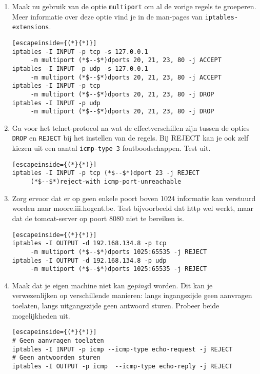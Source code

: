 \documentclass{report}
\begin{document}
\begin{enumerate}
	\item     Maak nu gebruik van de optie \texttt{multiport} om al de vorige regels te groeperen. Meer informatie over deze optie vind je in de man-pages van \texttt{iptables-extensions}.
	\begin{lstlisting}[escapeinside={(*}{*)}]
iptables -I INPUT -p tcp -s 127.0.0.1 
	 -m multiport (*$--$*)dports 20, 21, 23, 80 -j ACCEPT
iptables -I INPUT -p udp -s 127.0.0.1 
	 -m multiport (*$--$*)dports 20, 21, 23, 80 -j ACCEPT
iptables -I INPUT -p tcp 
	 -m multiport (*$--$*)dports 20, 21, 23, 80 -j DROP
iptables -I INPUT -p udp 
	 -m multiport (*$--$*)dports 20, 21, 23, 80 -j DROP
		\end{lstlisting}
		
	\item     Ga voor het telnet-protocol na wat de effectverschillen zijn tussen de opties \texttt{DROP} en \texttt{REJECT} bij het instellen van de regels.
	Bij REJECT kan je ook zelf kiezen uit een aantal \texttt{icmp-type 3} foutboodschappen. Test uit.
\begin{lstlisting}[escapeinside={(*}{*)}]
iptables -I INPUT -p tcp (*$--$*)dport 23 -j REJECT 
	 (*$--$*)reject-with icmp-port-unreachable
\end{lstlisting}

	\item     Zorg ervoor dat er op geen enkele poort boven 1024 informatie kan verstuurd worden naar moore.iii.hogent.be.
    Test bijvoorbeeld dat http wel werkt, maar dat de tomcat-server op poort 8080 niet te bereiken is.
\begin{lstlisting}[escapeinside={(*}{*)}]
iptables -I OUTPUT -d 192.168.134.8 -p tcp 
	 -m multiport (*$--$*)dports 1025:65535 -j REJECT
iptables -I OUTPUT -d 192.168.134.8 -p udp 
	 -m multiport (*$--$*)dports 1025:65535 -j REJECT
\end{lstlisting}
	\item     Maak dat je eigen machine niet kan ge\emph{ping}d worden. Dit kan je verwezenlijken op verschillende manieren: langs ingangszijde geen aanvragen toelaten, langs uitgangszijde geen antwoord sturen. Probeer beide mogelijkheden uit.
\begin{lstlisting}[escapeinside={(*}{*)}]
# Geen aanvragen toelaten
iptables -I INPUT -p icmp --icmp-type echo-request -j REJECT
# Geen antwoorden sturen
iptables -I OUTPUT -p icmp  --icmp-type echo-reply -j REJECT
\end{lstlisting}
\end{enumerate}
\end{document}
